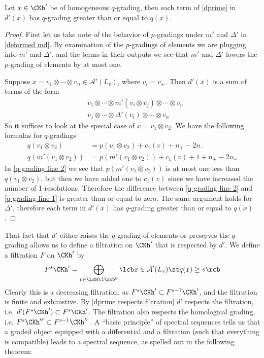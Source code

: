 \begin{prop}
\label{dprime respects filtration}
Let $x \in \CKh'$ be of homogeneous $q$-grading, then each term of \eqref{dprime} in $d'(x)$ has $q$-grading greater than or equal to $q(x)$.
\end{prop}
\begin{proof}
First let us take note of the behavior of $p$-gradings under $m'$ and $\Delta'$ in \eqref{deformed md}. By examination of the $p$-gradings of elements we are plugging into $m'$ and $\Delta'$, and the terms in their outputs we see that $m'$ and $\Delta'$ lowers the $p$-grading of elements by at most one.

Suppose $x = v_1 \otimes \cdots \otimes v_n \in \mathcal A'(L_v)$, where $v_i = v_\pm$. Then $d'(x)$ is a sum of terms of the form
\begin{align*}
&v_1 \otimes \cdots \otimes m'(v_i \otimes v_j) \otimes \cdots \otimes v_n \\
&v_1 \otimes \cdots \otimes \Delta'(v_i) \otimes \cdots \otimes v_n 
\end{align*}
So it suffices to look at the special case of $x = v_1 \otimes v_2$. We have the following formulas for $q$-gradings
\begin{align}
\label{q-grading line 1}
q(v_1 \otimes v_2) &= p(v_1 \otimes v_2) + c_1(v) + n_+ - 2n_- \\
\label{q-grading line 2}
q(m'(v_1 \otimes v_2)) &= p(m'(v_1 \otimes v_2)) + c_1(v) + 1 + n_+ - 2n_- 
\end{align}
In \eqref{q-grading line 2} we see that $p(m'(v_1\otimes v_2))$ is at most one less than $q(v_1\otimes v_2)$, but then we have added one to $c_1(v)$ since we have increased the number of 1-resolutions. Therefore the difference between \eqref{q-grading line 2} and \eqref{q-grading line 1} is greater than or equal to zero. The same argument holds for $\Delta'$, therefore each term in $d'(x)$ has $q$-grading greater than or equal to $q(x)$.
\end{proof}

That fact that $d'$ either raises the $q$-grading of elements or preserves the $q$-grading allows us to define a filtration on $\CKh'$ that is respected by $d'$. We define a filtration $F$ on $\CKh'$ by
\begin{equation}
\label{filtration}
F^s \CKh' = \bigoplus_{v \in \lcb 0,1 \rcb^k} \lcb x \in \mathcal A'(L_v) \st q(x) \geq s \rcb 
\end{equation}
Clearly this is a decreasing filtration, as $F^s \CKh' \subset F^{s-1} \CKh'$, and the filtration is finite and exhaustive. By \ref{dprime respects filtration} $d'$ respects the filtration, i.e. $d'(F^s \CKh') \subset F^s \CKh'$. The filtration also respects the homological grading, i.e. $F^s \CKh'^r \subset F^{s-1} \CKh'^r$.  A ``basic principle'' of spectral sequences tells us that a graded object equipped with a differential and a filtration (such that everything is compatible) leads to a spectral sequence, as spelled out in the following theorem:

